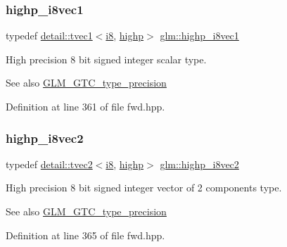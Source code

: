 \subsubsection{\texorpdfstring{highp\+\_\+i8vec1}{highp\_i8vec1}}
{\footnotesize\ttfamily typedef \hyperlink{structglm_1_1detail_1_1tvec1}{detail\+::tvec1}$<$\hyperlink{group__gtc__type__precision_gaae064be68b7d36cd7910c16e8ad18bba}{i8}, \hyperlink{namespaceglm_a0f04f086094c747d227af4425893f545ac6f7eab42eacbb10d59a58e95e362074}{highp}$>$ \hyperlink{group__gtc__type__precision_ga0334353753f93388bcc89f91c9aff476}{glm\+::highp\+\_\+i8vec1}}

High precision 8 bit signed integer scalar type. \begin{DoxySeeAlso}{See also}
\hyperlink{group__gtc__type__precision}{G\+L\+M\+\_\+\+G\+T\+C\+\_\+type\+\_\+precision} 
\end{DoxySeeAlso}


Definition at line 361 of file fwd.\+hpp.

\mbox{\label{group__gtc__type__precision_ga2224945795a870e41d951f0847d54f02}} 
\subsubsection{\texorpdfstring{highp\+\_\+i8vec2}{highp\_i8vec2}}
{\footnotesize\ttfamily typedef \hyperlink{structglm_1_1detail_1_1tvec2}{detail\+::tvec2}$<$\hyperlink{group__gtc__type__precision_gaae064be68b7d36cd7910c16e8ad18bba}{i8}, \hyperlink{namespaceglm_a0f04f086094c747d227af4425893f545ac6f7eab42eacbb10d59a58e95e362074}{highp}$>$ \hyperlink{group__gtc__type__precision_ga2224945795a870e41d951f0847d54f02}{glm\+::highp\+\_\+i8vec2}}

High precision 8 bit signed integer vector of 2 components type. \begin{DoxySeeAlso}{See also}
\hyperlink{group__gtc__type__precision}{G\+L\+M\+\_\+\+G\+T\+C\+\_\+type\+\_\+precision} 
\end{DoxySeeAlso}


Definition at line 365 of file fwd.\+hpp.

\mbox{\label{group__gtc__type__precision_gad716792169ce7de963df25b865714438}} 
